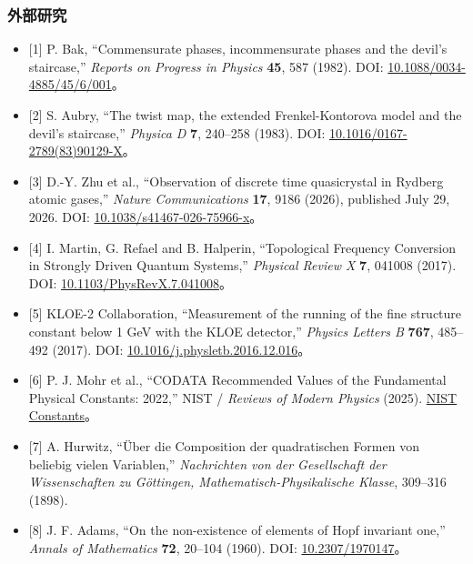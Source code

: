 \documentclass[
  a4paper,
]{ltjsarticle}
\providecommand{\tightlist}{%
  \setlength{\itemsep}{0pt}\setlength{\parskip}{0pt}}
\begin{document}
\subsubsection{外部研究}\label{ux5916ux90e8ux7814ux7a76}

\begin{itemize}
\tightlist
\item
  {[}1{]} P. Bak, ``Commensurate phases, incommensurate phases and the
  devil's staircase,'' \emph{Reports on Progress in Physics}
  \textbf{45}, 587 (1982). DOI:
  \href{https://doi.org/10.1088/0034-4885/45/6/001}{10.1088/0034-4885/45/6/001}。
\item
  {[}2{]} S. Aubry, ``The twist map, the extended Frenkel-Kontorova
  model and the devil's staircase,'' \emph{Physica D} \textbf{7},
  240--258 (1983). DOI:
  \href{https://doi.org/10.1016/0167-2789(83)90129-X}{10.1016/0167-2789(83)90129-X}。
\item
  {[}3{]} D.-Y. Zhu et al., ``Observation of discrete time quasicrystal
  in Rydberg atomic gases,'' \emph{Nature Communications} \textbf{17},
  9186 (2026), published July 29, 2026. DOI:
  \href{https://doi.org/10.1038/s41467-026-75966-x}{10.1038/s41467-026-75966-x}。
\item
  {[}4{]} I. Martin, G. Refael and B. Halperin, ``Topological Frequency
  Conversion in Strongly Driven Quantum Systems,'' \emph{Physical Review
  X} \textbf{7}, 041008 (2017). DOI:
  \href{https://doi.org/10.1103/PhysRevX.7.041008}{10.1103/PhysRevX.7.041008}。
\item
  {[}5{]} KLOE-2 Collaboration, ``Measurement of the running of the fine
  structure constant below 1 GeV with the KLOE detector,'' \emph{Physics
  Letters B} \textbf{767}, 485--492 (2017). DOI:
  \href{https://doi.org/10.1016/j.physletb.2016.12.016}{10.1016/j.physletb.2016.12.016}。
\item
  {[}6{]} P. J. Mohr et al., ``CODATA Recommended Values of the
  Fundamental Physical Constants: 2022,'' NIST / \emph{Reviews of Modern
  Physics} (2025). \href{https://physics.nist.gov/constants}{NIST
  Constants}。
\item
  {[}7{]} A. Hurwitz, ``Über die Composition der quadratischen Formen
  von beliebig vielen Variablen,'' \emph{Nachrichten von der
  Gesellschaft der Wissenschaften zu Göttingen,
  Mathematisch-Physikalische Klasse}, 309--316 (1898).
\item
  {[}8{]} J. F. Adams, ``On the non-existence of elements of Hopf
  invariant one,'' \emph{Annals of Mathematics} \textbf{72}, 20--104
  (1960). DOI: \href{https://doi.org/10.2307/1970147}{10.2307/1970147}。

\end{itemize}
\end{document}
